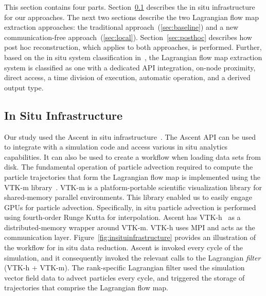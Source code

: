 This section contains four parts.
%
Section~\ref{sec:insituinfrastructure} describes the in situ infrastructure for our approaches.
%
The next two sections describe the two Lagrangian flow map extraction approaches:
the traditional approach~(\ref{sec:baseline}) and a new communication-free approach~(\ref{sec:local}).
%
Section~\ref{sec:posthoc} describes how post hoc reconstruction, which applies to both approaches, is performed.
%
%
Further, based on the in situ system classification in~\cite{childs2020istp}, the Lagrangian flow map extraction system is classified as one with a dedicated API integration, on-node proximity, direct access, a time division of execution, automatic operation, and a derived output type.

\subsection{In Situ Infrastructure}
\label{sec:insituinfrastructure}
Our study used the Ascent in situ infrastructure~\cite{Larsen2017Ascent}.
%
The Ascent API can be used to integrate with a simulation code and access various in situ analytics capabilities.
%
It can also be used to create a workflow when loading data sets from disk.
%
The fundamental operation of particle advection required to compute the particle trajectories that form the Lagrangian flow map is implemented using the VTK-m library~\cite{moreland2016vtk}.
%
VTK-m is a platform-portable scientific visualization library for shared-memory parallel environments. 
%
This library enabled us to easily engage GPUs for particle advection.
%
Specifically, in situ particle advection is performed using fourth-order Runge Kutta for interpolation.
%
Ascent has VTK-h~\cite{Larsen2017Ascent} as a distributed-memory wrapper around VTK-m.
%
VTK-h uses MPI and acts as the communication layer.
%
Figure~\ref{fig:insituinfrastructure} provides an illustration of the workflow for in situ data reduction.
%
Ascent is invoked every cycle of the simulation, and it consequently invoked the relevant calls to the Lagrangian \textit{filter} (VTK-h + VTK-m).
%
The rank-specific Lagrangian filter used the simulation vector field data to advect particles every cycle, and triggered the storage of trajectories that comprise the Lagrangian flow map. 
%
%



